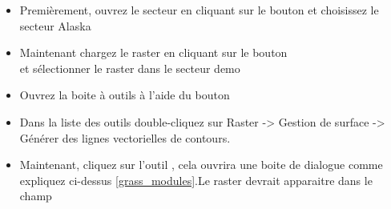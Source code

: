 {\begin{itemize}[label=--]
\item Premièrement, ouvrez le secteur en cliquant sur le bouton  et choisissez le secteur Alaska
\item Maintenant chargez le raster en cliquant sur le bouton\\  et sélectionner le raster  dans le secteur demo
\item Ouvrez la boite à outils à l'aide du bouton 
\item Dans la liste des outils double-cliquez sur Raster -> Gestion de surface -> Générer des lignes vectorielles de contours.
\item Maintenant, cliquez sur l'outil , cela ouvrira une boite de dialogue comme expliquez ci-dessus \ref{grass_modules}.Le raster  devrait apparaitre dans le champ\\ 

\end{itemize}}
